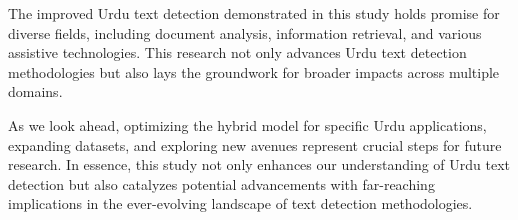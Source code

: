 \documentclass[default,iicol]{sn-jnl}%
\begin{document}
The improved Urdu text detection demonstrated in this study holds promise for diverse fields, including document analysis, information retrieval, and various assistive technologies. This research not only advances Urdu text detection methodologies but also lays the groundwork for broader impacts across multiple domains.

As we look ahead, optimizing the hybrid model for specific Urdu applications, expanding datasets, and exploring new avenues represent crucial steps for future research. In essence, this study not only enhances our understanding of Urdu text detection but also catalyzes potential advancements with far-reaching implications in the ever-evolving landscape of text detection methodologies.
\backmatter





\end{document}
